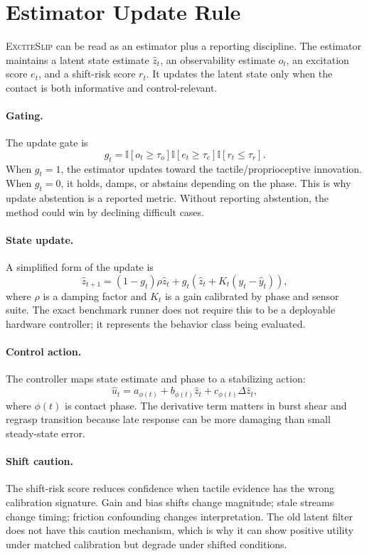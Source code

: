\documentclass{article}
\newcommand{\method}{\textsc{ExciteSlip}\xspace}
\begin{document}
\section{Estimator Update Rule}

\method can be read as an estimator plus a reporting discipline. The estimator maintains a latent state estimate $\hat{z}_t$, an observability estimate $o_t$, an excitation score $e_t$, and a shift-risk score $r_t$. It updates the latent state only when the contact is both informative and control-relevant.

\paragraph{Gating.}
The update gate is
\[
g_t = \mathbb{I}[o_t \geq \tau_o]\mathbb{I}[e_t \geq \tau_e]\mathbb{I}[r_t \leq \tau_r].
\]
When $g_t=1$, the estimator updates toward the tactile/proprioceptive innovation. When $g_t=0$, it holds, damps, or abstains depending on the phase. This is why update abstention is a reported metric. Without reporting abstention, the method could win by declining difficult cases.

\paragraph{State update.}
A simplified form of the update is
\[
\hat{z}_{t+1} = (1-g_t)\rho \hat{z}_{t} + g_t\left(\hat{z}_{t} + K_t(y_t - \hat{y}_t)\right),
\]
where $\rho$ is a damping factor and $K_t$ is a gain calibrated by phase and sensor suite. The exact benchmark runner does not require this to be a deployable hardware controller; it represents the behavior class being evaluated.

\paragraph{Control action.}
The controller maps state estimate and phase to a stabilizing action:
\[
\hat{u}_t = a_{\phi(t)} + b_{\phi(t)}\hat{z}_t + c_{\phi(t)}\Delta \hat{z}_t,
\]
where $\phi(t)$ is contact phase. The derivative term matters in burst shear and regrasp transition because late response can be more damaging than small steady-state error.

\paragraph{Shift caution.}
The shift-risk score reduces confidence when tactile evidence has the wrong calibration signature. Gain and bias shifts change magnitude; stale streams change timing; friction confounding changes interpretation. The old latent filter does not have this caution mechanism, which is why it can show positive utility under matched calibration but degrade under shifted conditions.
\end{document}
